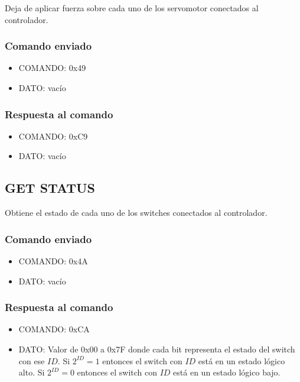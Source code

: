 \documentclass[a4paper,10pt]{article}
\begin{document}
Deja de aplicar fuerza sobre cada uno de los servomotor conectados al controlador.

\subsubsection*{Comando enviado}

\begin{itemize}
	\item{COMANDO:} 0x49
	\item{DATO:} vac\'io
\end{itemize}

\subsubsection*{Respuesta al comando}

\begin{itemize}
	\item{COMANDO:} 0xC9
	\item{DATO:} vac\'io
\end{itemize}

\subsection{GET STATUS}
\label{get_status_servos}

Obtiene el estado de cada uno de los switches conectados al controlador.

\subsubsection*{Comando enviado}

\begin{itemize}
	\item{COMANDO:} 0x4A
	\item{DATO:} vac\'io
\end{itemize}

\subsubsection*{Respuesta al comando}

\begin{itemize}
	\item{COMANDO:} 0xCA
	\item{DATO:} Valor de 0x00 a 0x7F donde cada bit representa el estado del switch con ese $ID$.
	Si $2^{ID} = 1$ entonces el switch con $ID$ est\'a en un estado l\'ogico alto.
	Si $2^{ID} = 0$ entonces el switch con $ID$ est\'a en un estado l\'ogico bajo.
\end{itemize}
\end{document}
